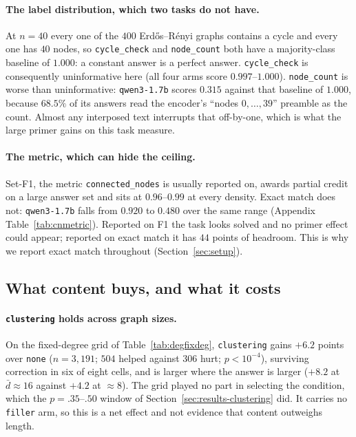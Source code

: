 \documentclass[11pt]{article}
\begin{document}
\paragraph{The label distribution, which two tasks do not have.} At $n{=}40$
every one of the $400$ Erd\H{o}s--R\'enyi graphs contains a cycle and every
one has $40$ nodes, so \texttt{cycle\_check} and \texttt{node\_count} both
have a majority-class baseline of $1.000$: a constant answer is a perfect
answer. \texttt{cycle\_check} is consequently uninformative here (all four
arms score $0.997$--$1.000$). \texttt{node\_count} is worse than
uninformative: \texttt{qwen3-1.7b} scores $0.315$ against that baseline of
$1.000$, because $68.5\%$ of its answers read the encoder's ``nodes
$0,\dots,39$'' preamble as the count. Almost any interposed text
interrupts that off-by-one, which is what the large primer gains on this
task measure.

\paragraph{The metric, which can hide the ceiling.} Set-F1, the metric
\texttt{connected\_nodes} is usually reported on, awards partial credit on
a large answer set and sits at $0.96$--$0.99$ at every density. Exact match
does not: \texttt{qwen3-1.7b} falls from $0.920$ to $0.480$ over the same
range (Appendix Table~\ref{tab:cnmetric}). Reported on F1 the task looks
solved and
no primer effect could appear; reported on exact match it has $44$ points
of headroom. This is why we report exact match throughout
(Section~\ref{sec:setup}).

\subsection{What content buys, and what it costs}
\label{sec:results-cost}

\paragraph{\texttt{clustering} holds across graph sizes.} On the
fixed-degree grid of Table~\ref{tab:degfixdeg}, \texttt{clustering} gains
$+6.2$ points over \texttt{none}
($n{=}3{,}191$; $504$ helped against $306$ hurt; $p{<}10^{-4}$), surviving
correction in six of eight cells, and is larger where the answer is larger
($+8.2$ at $\bar{d}{\approx}16$ against $+4.2$ at $\approx 8$). The grid
played no part in selecting the condition, which the $p{=}.35$--$.50$ window
of Section~\ref{sec:results-clustering} did. It carries no \texttt{filler}
arm, so this is a net effect and not evidence that content outweighs length.
\end{document}
